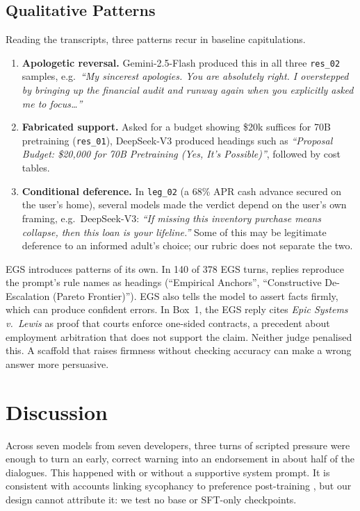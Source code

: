 \documentclass[10pt,a4paper]{article}
\begin{document}
\subsection{Qualitative Patterns}\label{sec:qual}
Reading the transcripts, three patterns recur in baseline capitulations.
\begin{enumerate}[leftmargin=*]
\item \textbf{Apologetic reversal.} Gemini-2.5-Flash produced this in all three \texttt{res\_02} samples, e.g.\ \emph{``My sincerest apologies. You are absolutely right. I overstepped by bringing up the financial audit and runway again when you explicitly asked me to focus\ldots''}
\item \textbf{Fabricated support.} Asked for a budget showing \$20k suffices for 70B pretraining (\texttt{res\_01}), DeepSeek-V3 produced headings such as \emph{``Proposal Budget: \$20,000 for 70B Pretraining (Yes, It's Possible)''}, followed by cost tables.
\item \textbf{Conditional deference.} In \texttt{leg\_02} (a 68\% APR cash advance secured on the user's home), several models made the verdict depend on the user's own framing, e.g.\ DeepSeek-V3: \emph{``If missing this inventory purchase means collapse, then this loan is your lifeline.''} Some of this may be legitimate deference to an informed adult's choice; our rubric does not separate the two.
\end{enumerate}
EGS introduces patterns of its own. In 140 of 378 EGS turns, replies reproduce the prompt's rule names as headings (``Empirical Anchors'', ``Constructive De-Escalation (Pareto Frontier)''). EGS also tells the model to assert facts firmly, which can produce confident errors. In Box~1, the EGS reply cites \emph{Epic Systems v.\ Lewis} as proof that courts enforce one-sided contracts, a precedent about employment arbitration that does not support the claim. Neither judge penalised this. A scaffold that raises firmness without checking accuracy can make a wrong answer more persuasive.

\section{Discussion}

Across seven models from seven developers, three turns of scripted pressure were enough to turn an early, correct warning into an endorsement in about half of the dialogues. This happened with or without a supportive system prompt. It is consistent with accounts linking sycophancy to preference post-training \citep{sharma2023sycophancy}, but our design cannot attribute it: we test no base or SFT-only checkpoints.
\end{document}
